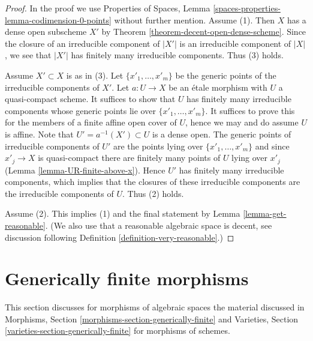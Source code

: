 \begin{proof}
In the proof we use Properties of Spaces, Lemma
\ref{spaces-properties-lemma-codimension-0-points}
without further mention.
Assume (1). Then $X$ has a dense open subscheme $X'$ by
Theorem \ref{theorem-decent-open-dense-scheme}.
Since the closure of an irreducible component of $|X'|$
is an irreducible component of $|X|$, we see that $|X'|$
has finitely many irreducible components. Thus (3) holds.

\medskip\noindent
Assume $X' \subset X$ is as in (3). Let $\{x'_1, \ldots, x'_m\}$
be the generic points of the irreducible components of $X'$.
Let $a : U \to X$ be an \'etale morphism with $U$ a quasi-compact scheme.
It suffices to show that $U$ has finitely many irreducible components
whose generic points lie over $\{x'_1, \ldots, x'_m\}$. It suffices
to prove this for the members of a finite affine open cover of $U$,
hence we may and do assume $U$ is affine.
Note that $U' = a^{-1}(X') \subset U$ is a dense open.
The generic points of irreducible components of $U'$ are the points
lying over $\{x'_1, \ldots, x'_m\}$ and since $x'_j \to X$ is
quasi-compact there are finitely many points of $U$ lying over $x'_j$
(Lemma \ref{lemma-UR-finite-above-x}). Hence $U'$ has finitely
many irreducible components, which implies that the closures
of these irreducible components are the irreducible components of
$U$. Thus (2) holds.

\medskip\noindent
Assume (2). This implies (1) and the final
statement by Lemma \ref{lemma-get-reasonable}.
(We also use that a reasonable algebraic space is decent, see
discussion following Definition \ref{definition-very-reasonable}.)
\end{proof}



\section{Generically finite morphisms}
\label{section-generically-finite}

\noindent
This section discusses for morphisms of algebraic spaces the material
discussed in Morphisms, Section \ref{morphisms-section-generically-finite}
and
Varieties, Section \ref{varieties-section-generically-finite}
for morphisms of schemes.

